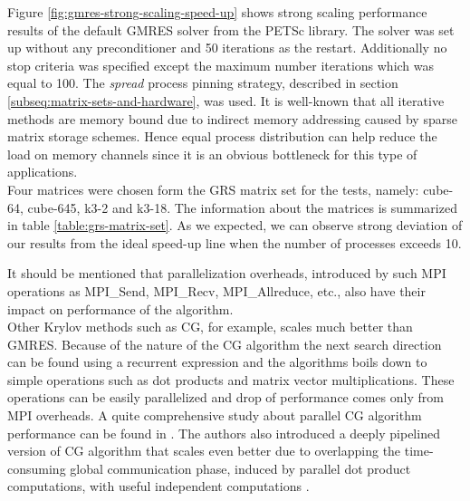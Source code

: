 Figure \ref{fig:gmres-strong-scaling-speed-up} shows strong scaling performance results of the default GMRES solver from the PETSc library. The solver was set up without any preconditioner and 50 iterations as the restart. Additionally no stop criteria was specified except the maximum number iterations which was equal to 100. The \textit{spread} process pinning strategy, described in section \ref{subseq:matrix-sets-and-hardware}, was used. It is well-known that all iterative methods are memory bound due to indirect memory addressing caused by sparse matrix storage schemes. Hence equal process distribution can help reduce the load on memory channels since it is an obvious bottleneck for this type of applications. \\


Four matrices were chosen form the GRS matrix set for the tests, namely: cube-64, cube-645, k3-2 and k3-18. The information about the matrices is summarized in table \ref{table:grs-matrix-set}. As we expected, we can observe strong deviation of our results from the ideal speed-up line when the number of processes exceeds 10.\\


\figpointer{\ref{fig:gmres-strong-scaling-speed-up}}

It should be mentioned that parallelization overheads, introduced by such MPI operations as MPI\_Send, MPI\_Recv, MPI\_Allreduce, etc., also have their impact on performance of the algorithm.\\

Other Krylov methods such as CG, for example, scales much better than GMRES. Because of the nature of the CG algorithm the next search direction can be found using a recurrent expression and the algorithms boils down to simple operations such as dot products and matrix vector multiplications. These operations can be easily parallelized and drop of performance comes only from MPI overheads. A quite comprehensive study about parallel CG algorithm performance can be found in \cite{sparse-la:cg}. The authors also introduced a deeply pipelined version of CG algorithm that scales even better due to overlapping the time-consuming global communication phase, induced by parallel dot product computations, with useful independent computations \cite{sparse-la:cg}.\\



